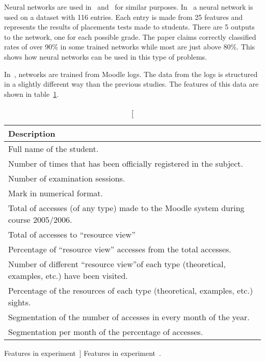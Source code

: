 Neural networks are used in~\cite{ind_003} and~\cite{ind_006} for similar
purposes. In~\cite{ind_003} a neural network is used on a dataset with 116
entries. Each entry is made from 25 features and represents the results of
placements tests made to students. There are 5 outputs to the network, one for
each possible grade. The paper claims correctly classified rates of over 90\%
in some trained networks while most are just above 80\%. This shows how neural
networks can be used in this type of problems.

In~\cite{ind_006}, networks are trained from Moodle logs. The data from the
logs is structured in a slightly different way than the previous studies. The
features of this data are shown in table~\ref{tab:ind_006_fields}.

\begin{table}[h!]
    \centering

    \begin{tabular}{l}
        Description \\ \hline
        Full name of the student. \\
        Number of times that has been officially registered in the subject. \\
        Number of examination sessions. \\
        Mark in numerical format. \\
        Total of accesses (of any type) made to the Moodle system during course 2005/2006. \\
        Total of accesses to “resource view” \\
        Percentage of “resource view” accesses from the total accesses. \\
        Number of different “resource view”of each type (theoretical, examples, etc.) have been visited. \\
        Percentage of the resources of each type (theoretical, examples, etc.) sights. \\
        Segmentation of the number of accesses in every month of the year. \\
        Segmentation per month of the percentage of accesses. \\
    \end{tabular}

    \caption
        [Features in experiment~\cite{ind_006}]
        {Features in experiment~\cite{ind_006}.}

    \label{tab:ind_006_fields}
\end{table}

